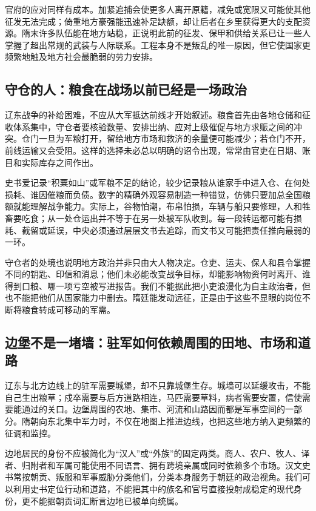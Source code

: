 官府的应对同样有成本。加紧追捕会使更多人离开原籍，减免或宽限又可能使其他征发无法完成；倚重地方豪强能迅速补足缺额，却让后者在乡里获得更大的支配资源。隋末许多队伍能在地方站稳，正说明此前的征发、保甲和供给关系已让一些人掌握了超出常规的武装与人际联系。工程本身不是叛乱的唯一原因，但它使国家更频繁地触及地方社会最脆弱的劳力安排。

\subsection{守仓的人：粮食在战场以前已经是一场政治}
辽东战争的补给困难，不应从大军抵达前线才开始叙述。粮食首先由各地仓储和征收体系集中，守仓者要核验数量、安排出纳、应对上级催促与地方求赈之间的冲突。仓门一旦为军粮打开，留给地方市场和救济的余量便可能减少；若仓门不开，前线运输又会受阻。这样的选择未必总以明确的诏令出现，常常由官吏在日期、账目和实际库存之间作出。

史书爱记录“积粟如山”或军粮不足的结论，较少记录粮从谁家手中进入仓、在何处损耗、谁因催粮而负债。数字的精确外观容易制造一种错觉，仿佛只要加总全国粮额就能理解战争能力。实际上，谷物怕潮，布帛怕损，车辆与船只要修理，人和牲畜要吃食；从一处仓运出并不等于在另一处被军队收到。每一段转运都可能有损耗、截留或延误，中央必须通过层层文书去追踪，而文书又可能把责任推向最弱的一环。

守仓者的处境也说明地方政治并非只由大人物决定。仓吏、运夫、保人和县令掌握不同的钥匙、印信和消息；他们未必能改变战争目标，却能影响物资何时离开、谁得到口粮、哪一项亏空被写进报告。我们不能据此把小吏浪漫化为自主政治者，但也不能把他们从国家能力中删去。隋廷能发动远征，正是由于这些不显眼的岗位不断将粮食转成可移动的军需。

\subsection{边堡不是一堵墙：驻军如何依赖周围的田地、市场和道路}
辽东与北方边线上的驻军需要城堡，却不只靠城堡生存。城墙可以延缓攻击，不能自己生出粮草；戍卒需要与后方道路相连，马匹需要草料，病者需要安置，信使需要能通过的关口。边堡周围的农地、集市、河流和山路因而都是军事空间的一部分。隋朝向东北集中军力时，不仅在地图上推进边线，也把这些地方纳入更频繁的征调和监控。

边地居民的身份不应被简化为“汉人”或“外族”的固定两类。商人、农户、牧人、译者、归附者和军属可能使用不同语言、拥有跨境亲属或同时依赖多个市场。汉文史书常按朝贡、叛服和军事威胁分类他们，分类本身服务于朝廷的政治视角。我们可以利用史书定位行动和道路，不能把其中的族名和官号直接投射成稳定的现代身份，更不能据朝贡词汇断言边地已被单向统属。

